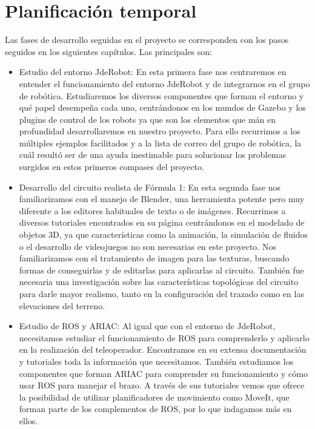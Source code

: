 \section{Planificación temporal}
\label{sec:obj_planificaciontemporal}

Las fases de desarrollo seguidas en el proyecto se corresponden con los pasos seguidos en los siguientes capítulos. Las principales son:

\begin{itemize}
	\item Estudio del entorno JdeRobot:
	En esta primera fase nos centraremos en entender el funcionamiento del entorno JdeRobot y de integrarnos en el grupo de robótica. Estudiaremos los diversos componentes que forman el entorno y qué papel desempeña cada uno, centrándonos en los mundos de Gazebo y los plugins de control de los robots ya que son los elementos que mán en profundidad desarrollaremos en nuestro proyecto. Para ello recurrimos a los múltiples ejemplos facilitados y a la lista de correo del grupo de robótica, la cuál resultó ser de una ayuda inestimable para solucionar los problemas surgidos en estos primeros compases del proyecto.
	
	\item Desarrollo del circuito realista de Fórmula 1:
	En esta segunda fase nos familiarizamos con el manejo de Blender, una herramienta potente pero muy diferente a los editores habituales de texto o de imágenes. Recurrimos a diversos tutoriales encontrados en su página centrándonos en el modelado de objetos 3D, ya que características como la animación, la simulación de fluidos o el desarrollo de videojuegos no son necesarias en este proyecto. Nos familiarizamos con el tratamiento de imagen para las texturas, buscando formas de conseguirlas y de editarlas para aplicarlas al circuito. También fue necesaria una investigación sobre las características topológicas del circuito para darle mayor realismo, tanto en la configuración del trazado como en las elevaciones del terreno.
	
	\item Estudio de ROS y ARIAC:
	Al igual que con el entorno de JdeRobot, necesitamos estudiar el funcionamiento de ROS para comprenderlo y aplicarlo en la realización del teleoperador. Encontramos en su extensa documentación y tutoriales toda la información que necesitamos. También estudiamos los componentes que forman ARIAC para comprender su funcionamiento y cómo usar ROS para manejar el brazo. A través de sus tutoriales vemos que ofrece la posibilidad de utilizar planificadores de movimiento como MoveIt, que forman parte de los complementos de ROS, por lo que indagamos más en ellos.
	

\end{itemize}
